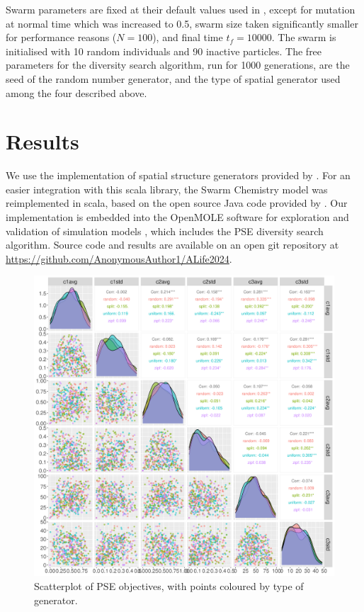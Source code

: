 \documentclass[letterpaper]{article}
\begin{document}
Swarm parameters are fixed at their default values used in \citep{sayama2018seeking}, except for mutation at normal time which was increased to 0.5, swarm size taken significantly smaller for performance reasons ($N=100$), and final time $t_f = 10000$. The swarm is initialised with 10 random individuals and 90 inactive particles. The free parameters for the diversity search algorithm, run for 1000 generations, are the seed of the random number generator, and the type of spatial generator used among the four described above. %

\section{Results}

We use the implementation of spatial structure generators provided by \citep{raimbault2020scala}. For an easier integration with this scala library, the Swarm Chemistry model was reimplemented in scala, based on the open source Java code provided by \citep{sayama2018seeking}. Our implementation is embedded into the OpenMOLE software for exploration and validation of simulation models \citep{reuillon2013openmole}, which includes the PSE diversity search algorithm. Source code and results are available on an open git repository at \url{https://github.com/AnonymousAuthor1/ALife2024}.


\begin{figure}
    \centering
    \includegraphics[width=\linewidth]{figures/pse-scatterplot_colorGenerator.png}
    \caption{Scatterplot of PSE objectives, with points coloured by type of generator.}
    \label{fig:pse}
\end{figure}
\end{document}
